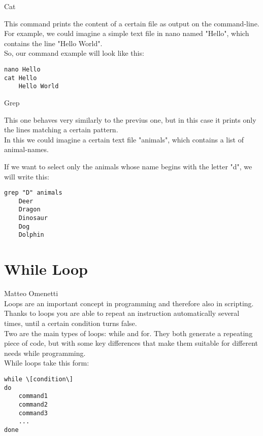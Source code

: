\documentclass[hidelinks,12pt,a4paper,numbers=enddot]{scrartcl}
\begin{document}
Cat

This command prints the content of a certain file as output on the
command-line.\\

For example, we could imagine a simple text file in nano named "Hello", which contains
the line "Hello World".\\
So, our command example will look like this:\\

\begin{verbatim}
nano Hello
cat Hello
    Hello World
\end{verbatim}



Grep

This one behaves very similarly to the previus one, but in this case it prints only
the lines matching a certain pattern.\\
In this we could imagine a certain text file "animals", which contains a list of animal-names.

If we want to select only the animals whose name begins with the letter "d", we will write this:\\

\begin{verbatim}
grep "D" animals
    Deer
    Dragon
    Dinosaur
    Dog
    Dolphin
\end{verbatim}

\section{While Loop}


\large Matteo Omenetti \normalsize\\




Loops are an important concept in programming and therefore also in scripting.
Thanks to loops you are able to repeat an instruction
automatically several times, until a certain condition turns false.\\

Two are the main types of loops: while and for. They both generate a repeating
piece of code, but with some key differences
that make them suitable for different needs while programming.\\

While loops take this form:
\begin{verbatim}
while \[condition\]
do
    command1
    command2
    command3
    ...
done
\end{verbatim}
\end{document}

